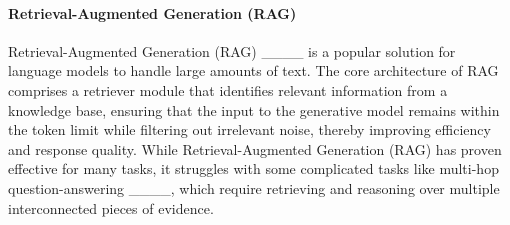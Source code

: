 \paragraph{Retrieval-Augmented Generation (RAG)}
Retrieval-Augmented Generation (RAG) ____ is a popular solution for language models to handle large amounts of text. The core architecture of RAG comprises a retriever module that identifies relevant information from a knowledge base, ensuring that the input to the generative model remains within the token limit while filtering out irrelevant noise, thereby improving efficiency and response quality.
While Retrieval-Augmented Generation (RAG) has proven effective for many tasks, it struggles with some complicated tasks like multi-hop question-answering ____, which require retrieving and reasoning over multiple interconnected pieces of evidence.
%